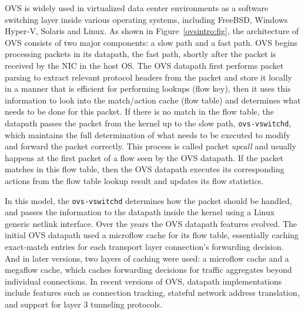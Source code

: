 \documentclass[10pt]{sigplanconf}
\newcommand{\mycomment}[1]{}
\begin{document}
OVS is widely used in virtualized data center environments as a software
switching layer inside various operating systems, including FreeBSD,
Windows Hyper-V, Solaris and Linux. As shown in
Figure~\ref{ovsintro:fig}, the architecture of OVS consists of two major
components: a slow path and a fast path. OVS begins processing packets
in its datapath, the fast path, shortly after the packet is received by the NIC in the host OS.
The OVS datapath first performs packet parsing to extract relevant protocol
headers from the packet and store it locally in a manner that is efficient for
performing lookups (flow key), then it uses this information to look into the
match/action cache (flow table) and determines what needs to be done for this
packet. If there is no match in the flow table, the datapath passes the packet
from the kernel up to the slow path, \verb+ovs-vswitchd+, which maintains the
full determination of what needs to be executed to modify and forward
the packet correctly.  This process is called packet {\em upcall} and
usually happens at the first packet of a flow seen by the OVS datapath.
If the packet matches in this flow table, then the OVS datapath executes its
corresponding actions from the flow table lookup result and updates its flow
statistics.

In this model, the \verb+ovs-vswitchd+ determines how the packet should be handled,
and passes the information to the datapath inside the kernel using a
Linux generic netlink interface.  Over the years the OVS datapath features evolved.
The initial OVS datapath used a microflow cache for its flow table,
essentially caching exact-match entries for each
transport layer connection's forwarding decision.  And in later versions,
two layers of caching were used: a microflow cache and a megaflow cache,
which caches forwarding decisions for traffic aggregates beyond individual
connections.  In recent versions of OVS, datapath implementations include
features such as connection tracking, stateful network address translation, and
support for layer 3 tunneling protocols.

\mycomment{
As each new feature in OVS datapath requires deep knowledge and programming
paradigm of the target operating system, e.g., how Linux packets are received,
how Windows kernel module does firewalling, and each operating system
community has its own software upstream and maintenance processes, the software
development cycle of a new datapath feature becomes complex and requires
detailed platform-specific knowledge. Each platform introduces its own
development and maintenance burden, and it is common for new features to take
six months or more before implementations are available across all datapaths.
As a result, providing a programmable OVS datapath which allows extending the
features flexibly with lower maintenance cost becomes a critical requirement.
}
\end{document}

